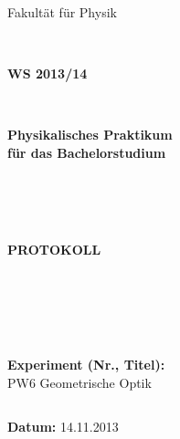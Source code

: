 \documentclass[12pt,a4paper]{article}
\begin{document}
%
%

%




\thispagestyle{empty}
			\begin{center}
			\Large{Fakultät für Physik}\\
			\end{center}
\begin{verbatim}


\end{verbatim}
			\begin{center}
			\textbf{\LARGE WS 2013/14}
			\end{center}
\begin{verbatim}


\end{verbatim}
			\begin{center}
			\textbf{\LARGE{Physikalisches Praktikum\\ für das Bachelorstudium}}
			\end{center}
\begin{verbatim}




\end{verbatim}

			\begin{center}
			\textbf{\LARGE{PROTOKOLL}}
			\end{center}
			
\begin{verbatim}





\end{verbatim}

			\begin{flushleft}
			\textbf{\Large{Experiment (Nr., Titel):}}\\
			\LARGE{PW6 Geometrische Optik}	
			\end{flushleft}

\begin{verbatim}

\end{verbatim}	
			\begin{flushleft}
			\textbf{\Large{Datum:}} \Large{14.11.2013}
			\end{flushleft}
			
\end{document}
